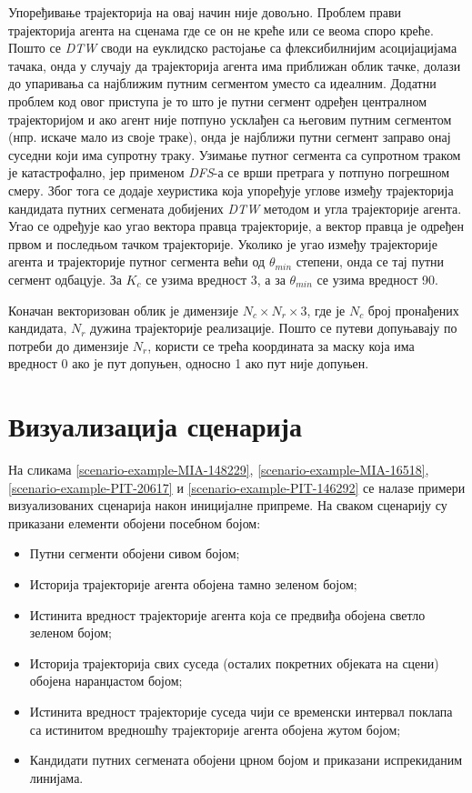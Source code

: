 \documentclass[11pt,oneside]{memoir}
\begin{document}
Упоређивање трајекторија на овај начин није довољно. Проблем прави трајекторија агента на сценама где се он не креће или се веома споро креће. Пошто
се \textit{DTW} своди на еуклидско растојање са флексибилнијим асоцијацијама тачака, 
онда у случају да трајекторија агента има приближан облик тачке, долази до упаривања са најближим путним сегментом уместо са идеалним. Додатни проблем 
код овог приступа је
то што је путни сегмент одређен централном трајекторијом и ако агент није потпуно усклађен са његовим путним сегментом (нпр. искаче мало
из своје траке), онда је 
најближи путни сегмент заправо онај суседни који има супротну траку. Узимање путног сегмента са супротном траком је катастрофално,
јер применом \textit{DFS}-а се врши претрага у потпуно погрешном смеру. Због тога се додаје хеуристика која упоређује углове између
трајекторија кандидата путних сегмената добијених \textit{DTW} методом и угла трајекторије агента. Угао се одређује као угао вектора правца
трајекторије, а вектор правца је одређен првом и последњом тачком трајекторије. Уколико је угао између трајекторије агента и 
трајекторије путног сегмента већи од $\theta_{min}$ степени, онда се тај путни сегмент одбацује. За $K_c$ се узима вредност 3, а
за $\theta_{min}$ се узима вредност 90.

Коначан векторизован облик је димензије $N_c\times N_r\times 3$, где је $N_c$ број пронађених кандидата,
$N_r$ дужина трајекторије реализације. Пошто се путеви допуњавају по потреби до димензије $N_r$, користи се трећа координата
за маску која има вредност 0 ако је пут допуњен, односно 1 ако пут није допуњен. 

\section{Визуализација сценарија}

На сликама \ref{scenario-example-MIA-148229}, \ref{scenario-example-MIA-16518}, \ref{scenario-example-PIT-20617} и \ref{scenario-example-PIT-146292} 
се налазе примери визуализованих сценарија након иницијалне припреме. На сваком сценарију су приказани елементи обојени посебном бојом:
\begin{itemize}
  \item Путни сегменти обојени сивом бојом;
  \item Историја трајекторије агента обојена тамно зеленом бојом;
  \item Истинита вредност трајекторије агента која се предвиђа обојена светло зеленом бојом;
  \item Историја трајекторија свих суседа (осталих покретних објеката на сцени) обојена наранџастом бојом;
  \item Истинита вредност трајекторије суседа чији се временски интервал поклапа са истинитом вредношћу трајекторије агента обојена жутом бојом;
  \item Кандидати путних сегмената обојени црном бојом и приказани испрекиданим линијама.
\end{itemize}
\end{document}
